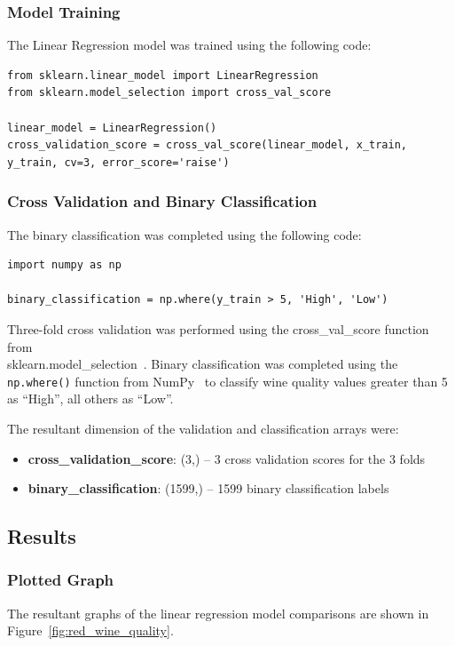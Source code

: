 \subsubsection{Model Training}
The Linear Regression model was trained using the following code:
\begin{verbatim}
from sklearn.linear_model import LinearRegression
from sklearn.model_selection import cross_val_score

linear_model = LinearRegression()
cross_validation_score = cross_val_score(linear_model, x_train, y_train, cv=3, error_score='raise')
\end{verbatim}

\subsubsection{Cross Validation and Binary Classification}
The binary classification was completed using the following code:
\begin{verbatim}
import numpy as np

binary_classification = np.where(y_train > 5, 'High', 'Low')
\end{verbatim}

Three-fold cross validation was performed using the cross\_val\_score function from \\ sklearn.model\_selection~\cite{sklearn_cross_validation}.
Binary classification was completed using the \texttt{np.where}\texttt{()} function from NumPy~\cite{numpy_where} 
to classify wine quality values greater than 5 as ``High'', all others as ``Low''.\bigskip

\noindent The resultant dimension of the validation and classification arrays were:
\begin{itemize}
    \item \textbf{cross\_validation\_score}: (3,) -- 3 cross validation scores for the 3 folds
    \item \textbf{binary\_classification}: (1599,) -- 1599 binary classification labels
\end{itemize}

\subsection{Results}
\subsubsection{Plotted Graph}
The resultant graphs of the linear regression model comparisons are shown in Figure~\ref{fig:red_wine_quality}.

